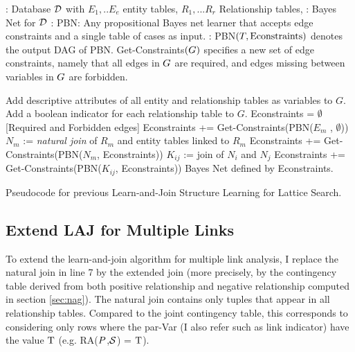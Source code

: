\documentclass{sfuthesis}
\begin{document}
\begin{algorithm}[!h]
\begin{algorithmic}
{\footnotesize
{}: Database $\D$ with $E_1,..E_e$ entity tables, $R_1,... R_r$ Relationship tables, %
: Bayes Net for $\D$ 
: PBN: Any propositional Bayes net learner that accepts edge constraints and a single table of cases as input. 
: PBN$(\T,\mbox{Econstraints})$ denotes the output DAG of PBN. Get-Constraints$(\G)$ specifies a new set of edge constraints, namely that all edges in $\G$ are required, and edges missing between variables in $\G$ are forbidden.
} %
\end{algorithmic}
\begin{algorithmic}[1]
{\footnotesize
  \STATE Add descriptive attributes of all entity and relationship tables as variables to  $G$. Add a boolean indicator for each relationship table to $G$.
  \STATE Econstraints = $\emptyset$ {[Required and Forbidden edges]} %
  \STATE Econstraints += Get-Constraints(PBN($E_m$ , $\emptyset$)) 
  \ENDFOR 
{}
  \STATE $N_m$ :=  {\em natural join} of $R_m$ and entity tables linked to $R_m$ 
  \STATE Econstraints += Get-Constraints(PBN($N_m$, Econstraints))
\ENDFOR
{}
  \STATE $K_{ij}$ :=  %
  join of $N_i$ and $N_j$ 
  \STATE Econstraints += Get-Constraints(PBN($K_{ij}$, Econstraints))
\ENDFOR
\RETURN Bayes Net defined by Econstraints.
    }
\end{algorithmic}
\caption{Pseudocode for previous Learn-and-Join Structure Learning for Lattice Search. \label{alg:structure}}
\end{algorithm}


\subsection {Extend LAJ for Multiple Links}\label{sec:exlaj}

To extend the learn-and-join algorithm for multiple link analysis, I replace the natural join in line 7 by the extended join (more precisely, by the contingency table derived from both positive relationship and negative relationship computed in section \ref{sec:nag}). 
The natural join contains only tuples that appear in all relationship tables. Compared to the joint contingency table, this corresponds to considering only rows where the par-Var (I also refer such as link indicator) have the value \textbf{$\true$} (e.g. RA($\P$,$\S$) = $\true$).
\end{document}
